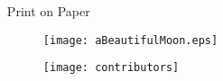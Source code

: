 \documentclass[serif,mathserif,final]{beamer}
\begin{document}
{\begin{frame}[fragile]{}
\begin{columns}[t]
\begin{column}{0.32\linewidth}
    \end{column}%

    \begin{column}{0.32\linewidth}

      \begin{block}{\rule{0pt}{1in}Print on Paper}
        \begin{figure}[htb]
        \centering
          \texttt{[image: aBeautifulMoon.eps]}
        \end{figure}
      \end{block}

      \begin{block}{\rule{0pt}{1in}\raisebox{.2\height}{Collaborate with GitHub}}
        \large
        \centering
        \begin{figure}[htb]
        \centering
          \texttt{[image: contributors]}
        \end{figure}
      \end{block}

    \end{column}
 
  \end{columns}
\end{frame}
}
\end{document}
